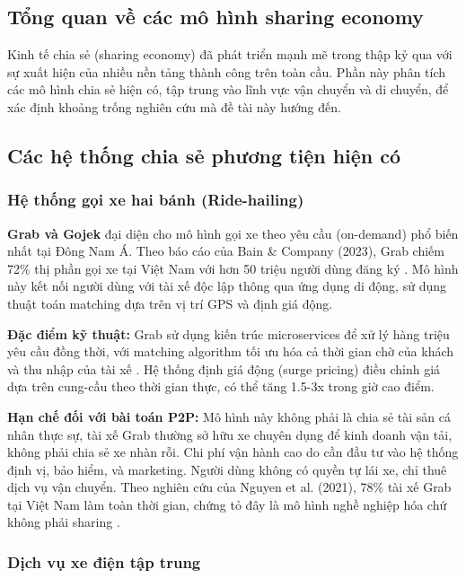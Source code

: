 \subsection{Tổng quan về các mô hình sharing economy}

Kinh tế chia sẻ (sharing economy) đã phát triển mạnh mẽ trong thập kỷ qua với sự xuất hiện của nhiều nền tảng thành công trên toàn cầu. Phần này phân tích các mô hình chia sẻ hiện có, tập trung vào lĩnh vực vận chuyển và di chuyển, để xác định khoảng trống nghiên cứu mà đề tài này hướng đến.

\subsection{Các hệ thống chia sẻ phương tiện hiện có}

\subsubsection{Hệ thống gọi xe hai bánh (Ride-hailing)}

\textbf{Grab và Gojek} đại diện cho mô hình gọi xe theo yêu cầu (on-demand) phổ biến nhất tại Đông Nam Á. Theo báo cáo của Bain \& Company (2023), Grab chiếm 72\% thị phần gọi xe tại Việt Nam với hơn 50 triệu người dùng đăng ký \cite{bain2023}. Mô hình này kết nối người dùng với tài xế độc lập thông qua ứng dụng di động, sử dụng thuật toán matching dựa trên vị trí GPS và định giá động.

\textbf{Đặc điểm kỹ thuật:} Grab sử dụng kiến trúc microservices để xử lý hàng triệu yêu cầu đồng thời, với matching algorithm tối ưu hóa cả thời gian chờ của khách và thu nhập của tài xế \cite{grab2022}. Hệ thống định giá động (surge pricing) điều chỉnh giá dựa trên cung-cầu theo thời gian thực, có thể tăng 1.5-3x trong giờ cao điểm.

\textbf{Hạn chế đối với bài toán P2P:} Mô hình này không phải là chia sẻ tài sản cá nhân thực sự, tài xế Grab thường sở hữu xe chuyên dụng để kinh doanh vận tải, không phải chia sẻ xe nhàn rỗi. Chi phí vận hành cao do cần đầu tư vào hệ thống định vị, bảo hiểm, và marketing. Người dùng không có quyền tự lái xe, chỉ thuê dịch vụ vận chuyển. Theo nghiên cứu của Nguyen et al. (2021), 78\% tài xế Grab tại Việt Nam làm toàn thời gian, chứng tỏ đây là mô hình nghề nghiệp hóa chứ không phải sharing \cite{nguyen2021}.

\subsubsection{Dịch vụ xe điện tập trung}

